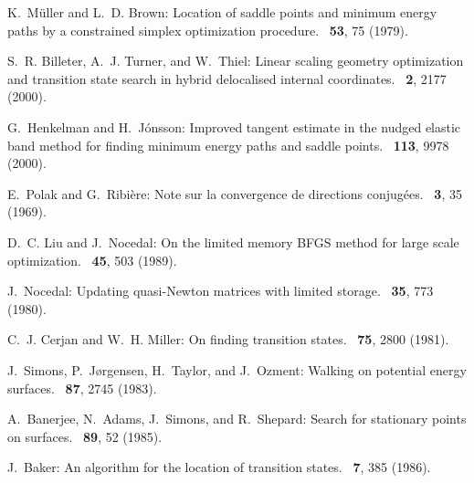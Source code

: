 \documentclass{article}
\begin{document}
\begin{thebibliography}{10}
K.~M{\"u}ller and L.~D. Brown:
\newblock Location of saddle points and minimum energy paths by a constrained
  simplex optimization procedure.
~{\bf 53}, 75  (1979).

S.~R. Billeter, A.~J. Turner, and W.~Thiel:
\newblock Linear scaling geometry optimization and transition state search in
  hybrid delocalised internal coordinates.
~{\bf 2}, 2177  (2000).

G.~Henkelman and H.~J{\'o}nsson:
\newblock Improved tangent estimate in the nudged elastic band method for
  finding minimum energy paths and saddle points.
~{\bf 113}, 9978  (2000).

E.~Polak and G.~Ribi\`ere:
\newblock Note sur la convergence de directions conjug\'ees.
~{\bf 3}, 35  (1969).

D.~C. Liu and J.~Nocedal:
\newblock On the limited memory BFGS method for large scale optimization.
~{\bf 45}, 503  (1989).

J.~Nocedal:
\newblock Updating quasi-Newton matrices with limited storage.
~{\bf 35}, 773  (1980).

C.~J. Cerjan and W.~H. Miller:
\newblock On finding transition states.
~{\bf 75}, 2800  (1981).

J.~Simons, P.~J{\o}rgensen, H.~Taylor, and J.~Ozment:
\newblock Walking on potential energy surfaces.
~{\bf 87}, 2745  (1983).

A.~Banerjee, N.~Adams, J.~Simons, and R.~Shepard:
\newblock Search for stationary points on surfaces.
~{\bf 89}, 52  (1985).

J.~Baker:
\newblock An algorithm for the location of transition states.
~{\bf 7}, 385  (1986).

\end{thebibliography}
\end{document}
